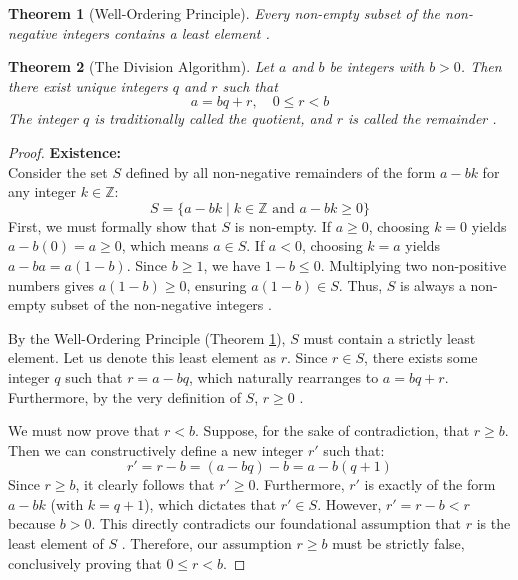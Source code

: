 \documentclass[11pt]{article}
\theoremstyle{definition}
\theoremstyle{plain}
\newtheorem{theorem}{Theorem}[section]
\theoremstyle{remark}
\begin{document}
\begin{theorem}[Well-Ordering Principle] \label{thm:wop}
Every non-empty subset of the non-negative integers contains a least element \cite{fraleigh}.
\end{theorem}

\begin{theorem}[The Division Algorithm] \label{thm:division}
Let $a$ and $b$ be integers with $b > 0$. Then there exist unique integers $q$ and $r$ such that 
\begin{equation}
    a = bq + r, \quad 0 \le r < b
\end{equation}
The integer $q$ is traditionally called the quotient, and $r$ is called the remainder \cite{fraleigh}.
\end{theorem}

\begin{proof}
\textbf{Existence:} \\
Consider the set $S$ defined by all non-negative remainders of the form $a - bk$ for any integer $k \in \mathbb{Z}$:
\begin{equation}
    S = \{ a - bk \mid k \in \mathbb{Z} \text{ and } a - bk \ge 0 \}
\end{equation}
First, we must formally show that $S$ is non-empty. 
If $a \ge 0$, choosing $k = 0$ yields $a - b(0) = a \ge 0$, which means $a \in S$. 
If $a < 0$, choosing $k = a$ yields $a - ba = a(1 - b)$. Since $b \ge 1$, we have $1 - b \le 0$. Multiplying two non-positive numbers gives $a(1 - b) \ge 0$, ensuring $a(1 - b) \in S$. 
Thus, $S$ is always a non-empty subset of the non-negative integers \cite{dummit}.

By the Well-Ordering Principle (Theorem \ref{thm:wop}), $S$ must contain a strictly least element. Let us denote this least element as $r$. Since $r \in S$, there exists some integer $q$ such that $r = a - bq$, which naturally rearranges to $a = bq + r$. Furthermore, by the very definition of $S$, $r \ge 0$ \cite{gallian}.

We must now prove that $r < b$. Suppose, for the sake of contradiction, that $r \ge b$. Then we can constructively define a new integer $r'$ such that:
\begin{equation}
    r' = r - b = (a - bq) - b = a - b(q + 1)
\end{equation}
Since $r \ge b$, it clearly follows that $r' \ge 0$. Furthermore, $r'$ is exactly of the form $a - bk$ (with $k = q + 1$), which dictates that $r' \in S$. However, $r' = r - b < r$ because $b > 0$. This directly contradicts our foundational assumption that $r$ is the least element of $S$ \cite{fraleigh}. Therefore, our assumption $r \ge b$ must be strictly false, conclusively proving that $0 \le r < b$.


\end{proof}
\end{document}
